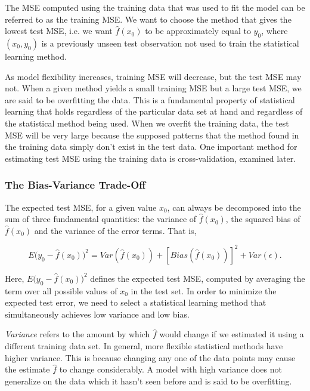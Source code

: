 \documentclass{article}
\numberwithin{equation}{section}
\begin{document}
The MSE computed using the training data that was used to fit the model can be referred to as the training
MSE. We want to choose the method that gives
the lowest test MSE, i.e. we want $\hat f(x_0)$ to be approximately equal to $y_0$, where $(x_0, y_0)$ is a previously unseen test observation not used to train the statistical learning method.

As model flexibility increases, training MSE will decrease, but the test MSE may not. When a given method yields a small training MSE but a large test MSE, we are said to be overfitting the data. This is a fundamental property of statistical learning that holds regardless of the particular data set at hand and regardless of the statistical method being used. When we overfit
the training data, the test MSE will be very large because the supposed patterns that the method found in the training data simply don’t exist in the test data. One important method for estimating test MSE using the training data is cross-validation, examined later. 

\subsubsection{The Bias-Variance Trade-Off}

The expected test MSE, for a given value $x_0$, can always be decomposed into the sum of three fundamental quantities: the variance of $\hat f(x_0)$, the squared bias of $\hat f(x_0)$ and the variance of the error terms. That is,

\begin{equation}
    E \Big (y_0 - \hat f(x_0) \Big )^2 = Var( \hat f(x_0)) + [Bias( \hat f(x_0))]^2 + Var(\epsilon).
\end{equation}

Here, $E \Big (y_0 - \hat f(x_0) \Big )^2$ defines the expected test MSE, computed by averaging the term over all possible values of $x_0$ in the test set. In order to minimize the expected test error, we need to select a statistical learning method that simultaneously achieves low variance and low bias. 

\textit{Variance} refers to the amount by which $\hat f$ would change if we estimated it using a different training data set. In general, more flexible statistical methods have higher variance. This is because changing any one of the data points may cause the estimate $\hat f$ to change considerably. A model with high variance does not generalize on the data which it hasn't seen before and is said to be overfitting.
\end{document}
